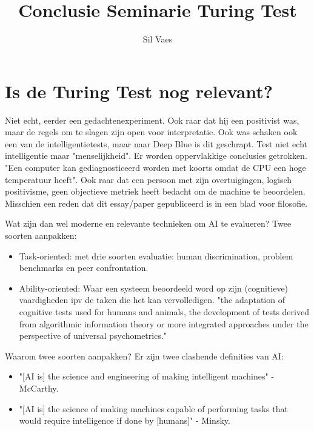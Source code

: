 \documentclass[11pt]{article}
\author{Sil Vaes}
\date{}
\title{Conclusie Seminarie Turing Test}
\begin{document}
\maketitle
\tableofcontents


\section{Is de Turing Test nog relevant?}
\label{sec:org874a562}

Niet echt, eerder een gedachtenexperiment. Ook raar dat hij een positivist was, maar de regels om te slagen zijn open voor interpretatie. Ook was schaken ook een van de intelligentietests, maar naar Deep Blue is dit geschrapt. Test niet echt intelligentie maar "menselijkheid". Er worden oppervlakkige conclusies getrokken. "Een computer kan gediagnosticeerd worden met koorts omdat de CPU een hoge temperatuur heeft". Ook raar dat een persoon met zijn overtuigingen, logisch positivisme, geen objectieve metriek heeft bedacht om de machine te beoordelen. Misschien een reden dat dit essay/paper gepubliceerd is in een blad voor filosofie.

Wat zijn dan wel moderne en relevante technieken om AI te evalueren? Twee  soorten aanpakken:

\begin{itemize}
\item Task-oriented: met drie soorten evaluatie: human discrimination, problem benchmarks en peer confrontation.
\item Ability-oriented: Waar een systeem beoordeeld word op zijn (cognitieve) vaardigheden ipv de taken die het kan vervolledigen. "the adaptation of cognitive tests used for humans and animals, the development of tests derived from algorithmic information theory or more integrated approaches under the perspective of universal psychometrics."
\end{itemize}

Waarom twee soorten aanpakken? Er zijn twee clashende definities van AI:

\begin{itemize}
\item "[AI is] the science and engineering of making intelligent machines" - McCarthy.
\item "[AI is] the science of making machines capable of performing tasks that would require intelligence if done by [humans]" - Minsky.
\end{itemize}
\end{document}
